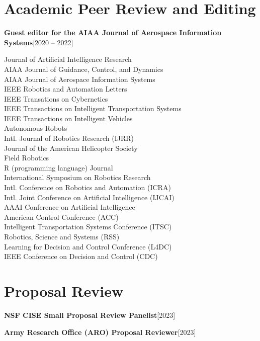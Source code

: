 \documentclass[10pt,roman]{moderncv}
\newcommand{\mycvitem}[2]{
    \textbf{#2}\hfill [#1]\break
}
\begin{document}
\section{Academic Peer Review and Editing}

\mycvitem{2020 -- 2022}{Guest editor for the AIAA Journal of Aerospace Information Systems}

\vspace{-2ex}
\begin{multicols}{2}
\small
Journal of Artificial Intelligence Research\\
AIAA Journal of Guidance, Control, and Dynamics\\
AIAA Journal of Aerospace Information Systems\\
IEEE Robotics and Automation Letters\\
IEEE Transations on Cybernetics\\
IEEE Transactions on Intelligent Transportation Systems\\
IEEE Transactions on Intelligent Vehicles\\
Autonomous Robots\\
Intl. Journal of Robotics Research (IJRR)\\
Journal of the American Helicopter Society\\
Field Robotics\\
R (programming language) Journal\\
International Symposium on Robotics Research\\
Intl. Conference on Robotics and Automation (ICRA)\\
Intl. Joint Conference on Artificial Intelligence (IJCAI)\\
AAAI Conference on Artificial Intelligence\\
American Control Conference (ACC)\\
Intelligent Transportation Systems Conference (ITSC)\\
Robotics, Science and Systems (RSS)\\
Learning for Decision and Control Conference (L4DC)\\
IEEE Conference on Decision and Control (CDC)\\
\end{multicols}

\section{Proposal Review}
\mycvitem{2023}{NSF CISE Small Proposal Review Panelist}
\mycvitem{2023}{Army Research Office (ARO) Proposal Reviewer}
\end{document}
